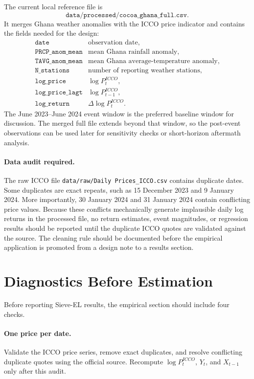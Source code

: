 \documentclass[11pt]{article}
\begin{document}
The current local reference file is
\[
    \texttt{data/processed/cocoa\_ghana\_full.csv}.
\]
It merges Ghana weather anomalies with the ICCO price indicator and contains the fields needed for the design:
\[
\begin{array}{ll}
\texttt{date} & \text{observation date},\\
\texttt{PRCP\_anom\_mean} & \text{mean Ghana rainfall anomaly},\\
\texttt{TAVG\_anom\_mean} & \text{mean Ghana average-temperature anomaly},\\
\texttt{N\_stations} & \text{number of reporting weather stations},\\
\texttt{log\_price} & \log P_t^{ICCO},\\
\texttt{log\_price\_lagt} & \log P_{t-1}^{ICCO},\\
\texttt{log\_return} & \Delta\log P_t^{ICCO}.
\end{array}
\]
The June 2023--June 2024 event window is the preferred baseline window for discussion. The merged full file extends beyond that window, so the post-event observations can be used later for sensitivity checks or short-horizon aftermath analysis.

\paragraph{Data audit required.}
The raw ICCO file \texttt{data/raw/Daily Prices\_ICCO.csv} contains duplicate dates. Some duplicates are exact repeats, such as 15 December 2023 and 9 January 2024. More importantly, 30 January 2024 and 31 January 2024 contain conflicting price values. Because these conflicts mechanically generate implausible daily log returns in the processed file, no return estimates, event magnitudes, or regression results should be reported until the duplicate ICCO quotes are validated against the source. The cleaning rule should be documented before the empirical application is promoted from a design note to a results section.

\section{Diagnostics Before Estimation}

Before reporting Sieve-EL results, the empirical section should include four checks.

\paragraph{One price per date.}
Validate the ICCO price series, remove exact duplicates, and resolve conflicting duplicate quotes using the official source. Recompute \(\log P_t^{ICCO}\), \(Y_t\), and \(X_{t-1}\) only after this audit.
\end{document}

